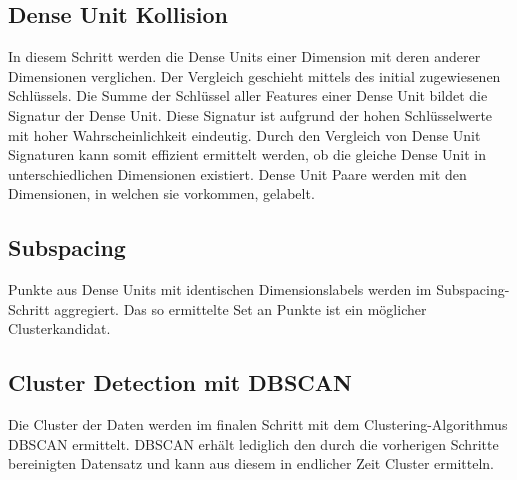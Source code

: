 \subsection{Dense Unit Kollision}
In diesem Schritt werden die Dense Units einer Dimension mit deren anderer Dimensionen verglichen. Der Vergleich
geschieht mittels des initial zugewiesenen Schlüssels. Die Summe der Schlüssel aller Features einer Dense Unit bildet
die Signatur der Dense Unit. Diese Signatur ist aufgrund der hohen Schlüsselwerte mit hoher Wahrscheinlichkeit
eindeutig. Durch den Vergleich von Dense Unit Signaturen kann somit effizient ermittelt werden, ob die gleiche Dense
Unit in unterschiedlichen Dimensionen existiert. Dense Unit Paare werden mit den Dimensionen, in welchen sie vorkommen,
gelabelt.

\subsection{Subspacing}
Punkte aus Dense Units mit identischen Dimensionslabels werden im Subspacing-Schritt aggregiert. Das so ermittelte Set
an Punkte ist ein möglicher Clusterkandidat.

\subsection{Cluster Detection mit DBSCAN}
Die Cluster der Daten werden im finalen Schritt mit dem Clustering-Algorithmus DBSCAN ermittelt. DBSCAN erhält lediglich
den durch die vorherigen Schritte bereinigten Datensatz und kann aus diesem in endlicher Zeit Cluster ermitteln.
